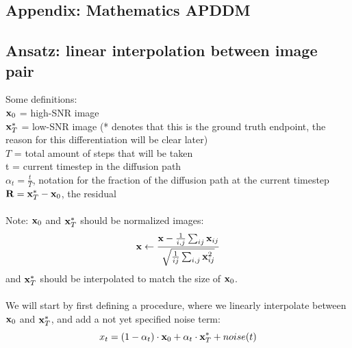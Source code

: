 \documentclass[twocolumn]{article}
\begin{document}
\begin{appendices}
\newpage

\section{Appendix: Mathematics APDDM}
\label{appendix:Mathematics APDDM}
\subsection{Ansatz: linear interpolation between image pair}
Some definitions:
\\
$\bold{x}_0$ = high-SNR image\\
$\bold{x}_T^*$ = low-SNR image (* denotes that this is the ground truth endpoint, the reason for this differentiation will be clear later)\\
$T$ = total amount of steps that will be taken\\
t = current timestep in the diffusion path \\
$\alpha_t = \frac{t}{T}$, notation for the fraction of the diffusion path at the current timestep\\
$\bold{R} = \bold{x}_T^* - \bold{x}_0$, the residual\\
\\
Note: $\bold{x}_0$ and $\bold{x}_T^*$ should be normalized images:
\begin{equation}
    \bold{x} \leftarrow \frac{\bold{x} - \frac{1}{i,j}\sum_{ij} \bold{x}_{ij}}{ \sqrt{ \frac{1}{ij} \sum_{i,j} \bold{x}_{ij}^2}}
\end{equation}
and $\bold{x}_T^*$ should be interpolated to match the size of $\bold{x}_0$.\\
\\
We will start by first defining a procedure, where we linearly interpolate between $\bold{x}_0$ and $\bold{x}_T^*$, and add a not yet specified noise term:
\begin{equation}
    x_t = (1-\alpha_t)\cdot\bold{x}_0 + \alpha_t\cdot\bold{x}_T^* + noise(t)
\end{equation}


\end{appendices}
\end{document}
